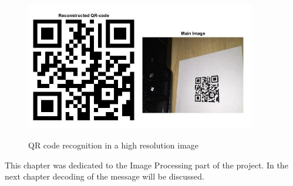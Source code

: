 \begin{figure}[H]
  \caption{QR code recognition in a high resolution image}
  \centering
    \includegraphics[width=0.9\textwidth]{figures/QR3.jpg}
    \label{fig:3.10}
\end{figure}


This chapter was dedicated to the Image Processing part of the project. In the next chapter decoding of the message will be discussed.








